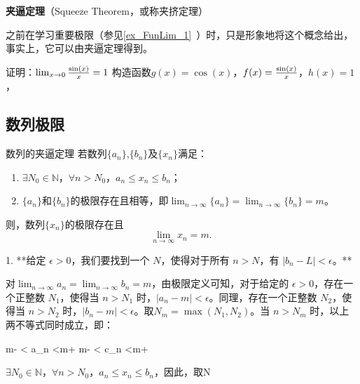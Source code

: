 
\begin{issues}
\issueDraft
\end{issues}
\textbf{夹逼定理}（Squeeze Theorem，或称夹挤定理）

之前在学习重要极限（参见\autoref{ex_FunLim_1}~）时，只是形象地将这个概念给出，事实上，它可以由夹逼定理得到。
\begin{example}{证明：$\lim_{x\to0}{\sin(x)\over x}=1$}
构造函数$g(x)=\cos(x)$，$f(x)={\sin(x)\over x}$，$h(x)=1$，
\end{example}

\subsection{数列极限}

\begin{theorem}{数列的夹逼定理}
若数列$\{a_n\}$,$\{b_n\}$及$\{x_n\}$满足：
\begin{enumerate}
\item $\exists N_0\in \mathbb{N}$，$\forall n>N_0$，$a_n\leq x_n\leq b_n$；
\item $\{a_n\}$和$\{b_n\}$的极限存在且相等，即$\lim_{n\to\infty}\{a_n\}=\lim_{n\to\infty}\{b_n\}=m$。
\end{enumerate}
则，数列$\{x_n\}$的极限存在且
\begin{equation}
\lim_{n\to\infty}x_n =m.~
\end{equation}
\end{theorem}


1. **给定 $\epsilon > 0$，我们要找到一个 $N$，使得对于所有 $n > N$，有 $|b_n - L| < \epsilon$。**

对$\lim_{n \to \infty} a_n = \lim_{n \to \infty} b_n = m$，由极限定义可知，对于给定的 $\epsilon > 0$，存在一个正整数 $N_1$，使得当 $n > N_1$ 时，$|a_n - m| < \epsilon$。同理，存在一个正整数 $N_2$，使得当 $n > N_2$ 时，$|b_n - m| < \epsilon$。取$N_m = \max(N_1, N_2)$。当 $n > N_m$ 时，以上两不等式同时成立，即：

  m- \epsilon < a_n <m+ \epsilon
  m- \epsilon < c_n <m+ \epsilon


$\exists N_0\in \mathbb{N}$，$\forall n>N_0$，$a_n\leq x_n\leq b_n$，因此，取N

